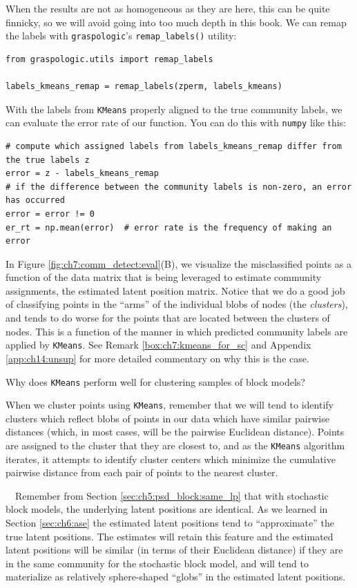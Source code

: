 When the results are not as homogeneous as they are here, this can be quite finnicky, so we will avoid going into too much depth in this book. We can remap the labels with \texttt{graspologic}'s \texttt{remap\_labels()} utility:

\begin{lstlisting}[style=python]
from graspologic.utils import remap_labels

labels_kmeans_remap = remap_labels(zperm, labels_kmeans)
\end{lstlisting}
With the labels from \texttt{KMeans} properly aligned to the true community labels, we can evaluate the error rate of our function. You can do this with \texttt{numpy} like this:

\begin{lstlisting}[style=python]
# compute which assigned labels from labels_kmeans_remap differ from the true labels z
error = z - labels_kmeans_remap
# if the difference between the community labels is non-zero, an error has occurred
error = error != 0
er_rt = np.mean(error)  # error rate is the frequency of making an error
\end{lstlisting}

In Figure \ref{fig:ch7:comm_detect:eval}(B), we visualize the misclassified points as a function of the data matrix that is being leveraged to estimate community assignments, the estimated latent position matrix. Notice that we do a good job of classifying points in the ``arms'' of the individual blobs of nodes (the \textit{clusters}), and tends to do worse for the points that are located between the clusters of nodes. This is a function of the manner in which predicted community labels are applied by \texttt{KMeans}. See Remark \ref{box:ch7:kmeans_for_sc} and Appendix \ref{app:ch14:unsup} for more detailed commentary on why this is the case.

\begin{floatingbox}[h]\caption{Why does \texttt{KMeans} perform well for clustering samples of block models?}
\label{box:ch7:kmeans_for_sc}
When we cluster points using \texttt{KMeans}, remember that we will tend to identify clusters which reflect blobs of points in our data which have similar pairwise distances (which, in most cases, will be the pairwise Euclidean distance). Points are assigned to the cluster that they are closest to, and as the \texttt{KMeans} algorithm iterates, it attempts to identify cluster centers which minimize the cumulative pairwise distance from each pair of points to the nearest cluster. 

\,\,\,\, Remember from Section \ref{sec:ch5:psd_block:same_lp} that with stochastic block models, the underlying latent positions are identical. As we learned in Section \ref{sec:ch6:ase} the estimated latent positions tend to ``approximate'' the true latent positions. The estimates will retain this feature and the estimated latent positions will be similar (in terms of their Euclidean distance) if they are in the same community for the stochastic block model, and will tend to materialize as relatively sphere-shaped ``globs'' in the estimated latent positions. 
\end{floatingbox}

